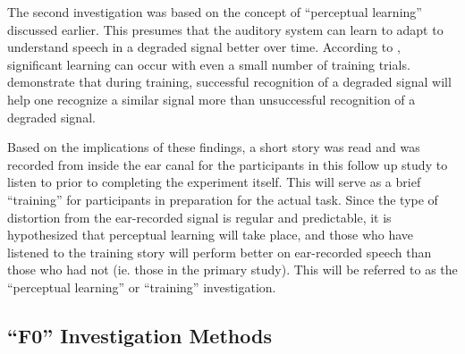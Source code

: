 \documentclass[dissertation,copyright]{uathesis}
\begin{document}
The second investigation was based on the concept of ``perceptual learning'' discussed earlier.  This presumes that the auditory system can learn to adapt to understand speech in a degraded signal better over time.  According to \cite{mattys:12}, significant learning can occur with even a small number of training trials.  \cite{davis:05} demonstrate that during training, successful recognition of a degraded signal will help one recognize a similar signal more than unsuccessful recognition of a degraded signal.  

Based on the implications of these findings, a short story was read and was recorded from inside the ear canal for the participants in this follow up study to listen to prior to completing the experiment itself.  This will serve as a brief ``training'' for participants in preparation for the actual task. Since the type of distortion from the ear-recorded signal is regular and predictable, it is hypothesized that perceptual learning will take place, and those who have listened to the training story will perform better on ear-recorded speech than those who had not (ie. those in the primary study). This will be referred to as the ``perceptual learning'' or ``training'' investigation.


\subsection{``F0'' Investigation Methods}
\label{F0-methods}
\end{document}
